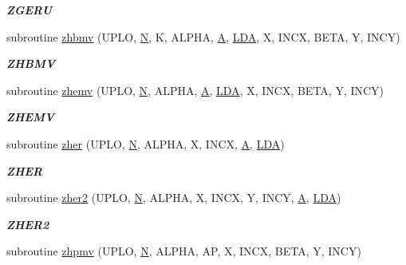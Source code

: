 \begin{DoxyCompactItemize}
\begin{DoxyCompactList}\small\item\em {\bfseries Z\+G\+E\+R\+U} \end{DoxyCompactList}\item 
subroutine \hyperlink{group__complex16__blas__level2_ga6f0283c18c02df85b4d4ad5e9f37c61d}{zhbmv} (U\+P\+L\+O, \hyperlink{polmisc_8c_a0240ac851181b84ac374872dc5434ee4}{N}, K, A\+L\+P\+H\+A, \hyperlink{classA}{A}, \hyperlink{example__user_8c_ae946da542ce0db94dced19b2ecefd1aa}{L\+D\+A}, X, I\+N\+C\+X, B\+E\+T\+A, Y, I\+N\+C\+Y)
\begin{DoxyCompactList}\small\item\em {\bfseries Z\+H\+B\+M\+V} \end{DoxyCompactList}\item 
subroutine \hyperlink{group__complex16__blas__level2_ga0a0a44bede5155c38da7cbca20880662}{zhemv} (U\+P\+L\+O, \hyperlink{polmisc_8c_a0240ac851181b84ac374872dc5434ee4}{N}, A\+L\+P\+H\+A, \hyperlink{classA}{A}, \hyperlink{example__user_8c_ae946da542ce0db94dced19b2ecefd1aa}{L\+D\+A}, X, I\+N\+C\+X, B\+E\+T\+A, Y, I\+N\+C\+Y)
\begin{DoxyCompactList}\small\item\em {\bfseries Z\+H\+E\+M\+V} \end{DoxyCompactList}\item 
subroutine \hyperlink{group__complex16__blas__level2_gab493f9f41552f058ed4f75e7d182ed65}{zher} (U\+P\+L\+O, \hyperlink{polmisc_8c_a0240ac851181b84ac374872dc5434ee4}{N}, A\+L\+P\+H\+A, X, I\+N\+C\+X, \hyperlink{classA}{A}, \hyperlink{example__user_8c_ae946da542ce0db94dced19b2ecefd1aa}{L\+D\+A})
\begin{DoxyCompactList}\small\item\em {\bfseries Z\+H\+E\+R} \end{DoxyCompactList}\item 
subroutine \hyperlink{group__complex16__blas__level2_gac1d92c5939cc624b2fd9e832121a0fd4}{zher2} (U\+P\+L\+O, \hyperlink{polmisc_8c_a0240ac851181b84ac374872dc5434ee4}{N}, A\+L\+P\+H\+A, X, I\+N\+C\+X, Y, I\+N\+C\+Y, \hyperlink{classA}{A}, \hyperlink{example__user_8c_ae946da542ce0db94dced19b2ecefd1aa}{L\+D\+A})
\begin{DoxyCompactList}\small\item\em {\bfseries Z\+H\+E\+R2} \end{DoxyCompactList}\item 
subroutine \hyperlink{group__complex16__blas__level2_gad4a66a9d545e2f11dd6ca5a666cc5316}{zhpmv} (U\+P\+L\+O, \hyperlink{polmisc_8c_a0240ac851181b84ac374872dc5434ee4}{N}, A\+L\+P\+H\+A, A\+P, X, I\+N\+C\+X, B\+E\+T\+A, Y, I\+N\+C\+Y)

\end{DoxyCompactItemize}
